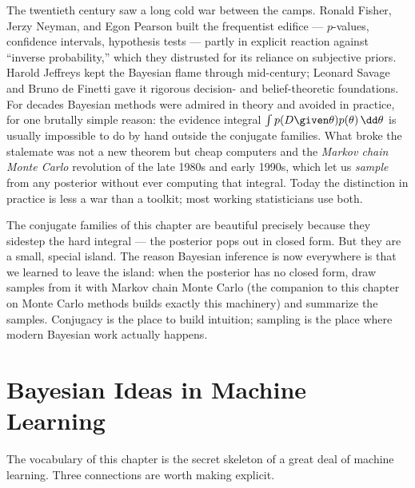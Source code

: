 \begin{historybox}
The twentieth century saw a long cold war between the camps. Ronald Fisher, Jerzy Neyman,
and Egon Pearson built the frequentist edifice --- $p$-values, confidence intervals,
hypothesis tests --- partly in explicit reaction against ``inverse probability,'' which
they distrusted for its reliance on subjective priors. Harold Jeffreys kept the Bayesian
flame through mid-century; Leonard Savage and Bruno de Finetti gave it rigorous decision-
and belief-theoretic foundations. For decades Bayesian methods were admired in theory and
avoided in practice, for one brutally simple reason: the evidence integral $\int p(D\given
\theta)p(\theta)\,\dd\theta$ is usually impossible to do by hand outside the conjugate
families. What broke the stalemate was not a new theorem but cheap computers and the
\emph{Markov chain Monte Carlo} revolution of the late 1980s and early 1990s, which let us
\emph{sample} from any posterior without ever computing that integral. Today the
distinction in practice is less a war than a toolkit; most working statisticians use both.
\end{historybox}

\begin{aestheticbox}
The conjugate families of this chapter are beautiful precisely because they sidestep the
hard integral --- the posterior pops out in closed form. But they are a small, special
island. The reason Bayesian inference is now everywhere is that we learned to leave the
island: when the posterior has no closed form, draw samples from it with Markov chain Monte
Carlo (the companion to this chapter on Monte Carlo methods builds exactly this machinery)
and summarize the samples. Conjugacy is the place to build intuition; sampling is the place
where modern Bayesian work actually happens.
\end{aestheticbox}

\section{Bayesian Ideas in Machine Learning}
\label{ch31:ml}

The vocabulary of this chapter is the secret skeleton of a great deal of machine learning.
Three connections are worth making explicit.

